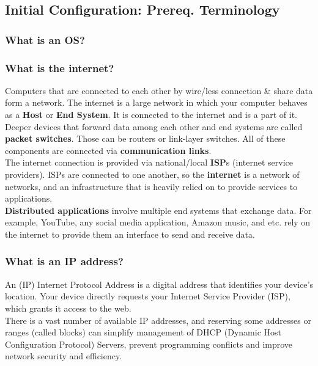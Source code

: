 \documentclass[a4paper, 10pt]{article}
\begin{document}
        \subsection{Initial Configuration: Prereq. Terminology}
            \subsubsection{What is an OS?}
            \subsubsection{What is the internet?}
                Computers that are connected to each other by wire/less connection & share data form a network. 
                The internet is a large network in which your computer behaves as a \textbf{Host} or \textbf{End System}. It is connected to the internet and is a part of it.
                Deeper devices that forward data among each other and end systems are called \textbf{packet switches}. Those can be routers or link-layer switches.
                All of these components are connected via \textbf{communication links}. \\

                The internet connection is provided via national/local \textbf{ISP}s (internet service providers). ISPs are connected to one another, so the \textbf{internet} is a network of networks, and an infrastructure that is heavily relied on to provide services to applications. \\

                \textbf{Distributed applications} involve multiple end systems that exchange data. For example, YouTube, any social media application, Amazon music, and etc. rely on the internet to provide them an interface to send and receive data.

            \subsubsection{What is an IP address?}
                An (IP) Internet Protocol Address is a digital address that identifies your device’s location.
                Your device directly requests your Internet Service Provider (ISP), which grants it access to the web. \\

                There is a vast number of available IP addresses, and reserving some addresses or ranges (called blocks) can simplify management of DHCP (Dynamic Host Configuration Protocol) Servers, prevent programming conflicts and improve network security and efficiency. 
\end{document}
